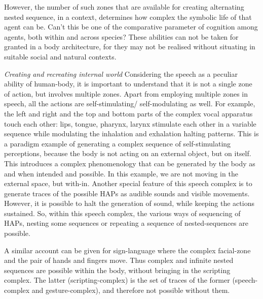 However, the number of such zones that are available for creating alternating nested sequence, in a context, determines how complex the symbolic life of that agent can be. Can't this be one of the comparative parameter of cognition among agents, both within and across species? These abilities can not be taken for granted in a body architecture, for they may not be realised without situating in suitable social and natural contexts. 

\emph{Creating and recreating internal world} Considering the speech as a peculiar ability of human-body, it is important to understand that it is not a single zone of action, but involves multiple zones. Apart from employing multiple zones in speech, all the actions are self-stimulating/ self-modulating as well. For example, the left and right and the top and bottom parts of the complex vocal apparatus touch each other: lips, tongue, pharynx, larynx stimulate each other in a variable sequence while modulating the inhalation and exhalation halting patterns. This is a paradigm example of generating a complex sequence of self-stimulating perceptions, because the body is not acting on an external object, but on itself. This introduces a complex phenomenology that can be generated by the body as and when intended and possible. In this example, we are not moving in the external space, but with-in. Another special feature of this speech complex is to generate traces of the possible HAPs as audible sounds and visible movements. However, it is possible to halt the generation of sound, while keeping the actions sustained. So, within this speech complex, the various ways of sequencing of HAPs, nesting some sequences or repeating a sequence of nested-sequences are possible. 

A similar account can be given for sign-language where the complex facial-zone and the pair of hands and fingers move. Thus complex and infinite nested sequences are possible within the body, without bringing in the scripting complex. The latter (scripting-complex) is the set of traces of the former (speech-complex and gesture-complex), and therefore not possible without them. 
 

